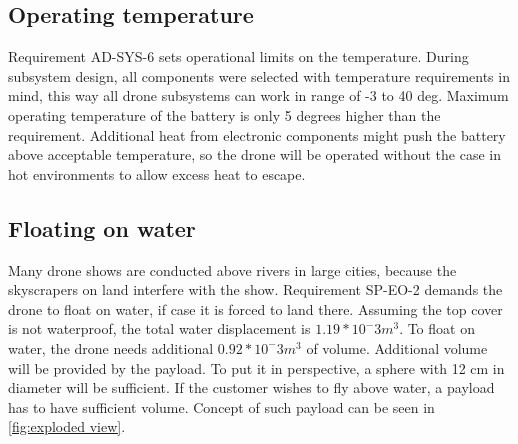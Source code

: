 \subsection{Operating temperature} \label{subsec:operating_temperature}
Requirement AD-SYS-6 sets operational limits on the temperature. During subsystem design, all components were selected with temperature requirements in mind, this way all drone subsystems can work in range of -3 to 40 deg. Maximum operating temperature of the battery is only 5 degrees higher than the requirement. Additional heat from electronic components might push the battery above acceptable temperature, so the drone will be operated without the case in hot environments to allow excess heat to escape.   

\subsection{Floating on water} \label{subsec:floating_on_water}
Many drone shows are conducted above rivers in large cities, because the skyscrapers on land interfere with the show. Requirement SP-EO-2 demands the drone to float on water, if case it is forced to land there. Assuming the top cover is not waterproof, the total water displacement is $1.19*10^-3 m^3$. To float on water, the drone needs additional $0.92*10^-3 m^3$ of volume. Additional volume will be provided by the payload. To put it in perspective, a sphere with 12 cm in diameter will be sufficient. If the customer wishes to fly above water, a payload has to have sufficient volume. Concept of such payload can be seen in \autoref{fig:exploded view}.


